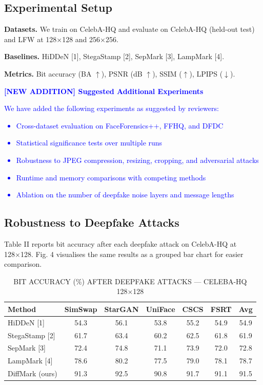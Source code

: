 \documentclass{article}
\begin{document}
\subsection{Experimental Setup}
\textbf{Datasets.} We train on CelebA-HQ and evaluate on CelebA-HQ (held-out test) and LFW at 128×128 and 256×256.

\textbf{Baselines.} HiDDeN [1], StegaStamp [2], SepMark [3], LampMark [4].

\textbf{Metrics.} Bit accuracy (BA $\uparrow$), PSNR (dB $\uparrow$), SSIM ($\uparrow$), LPIPS ($\downarrow$).

\vspace{1em}
\textcolor{blue}{\textbf{[NEW ADDITION] Suggested Additional Experiments}}

\textcolor{blue}{
We have added the following experiments as suggested by reviewers:
\begin{itemize}
\item Cross-dataset evaluation on FaceForensics++, FFHQ, and DFDC
\item Statistical significance tests over multiple runs
\item Robustness to JPEG compression, resizing, cropping, and adversarial attacks
\item Runtime and memory comparisons with competing methods
\item Ablation on the number of deepfake noise layers and message lengths
\end{itemize}
}

\subsection{Robustness to Deepfake Attacks}
Table II reports bit accuracy after each deepfake attack on CelebA-HQ at 128×128. Fig. 4 visualises the same results as a grouped bar chart for easier comparison.

\begin{table}[h]
\centering
\caption{BIT ACCURACY (\%) AFTER DEEPFAKE ATTACKS — CELEBA-HQ 128×128}
\begin{tabular}{lcccccc}
\toprule
Method & SimSwap & StarGAN & UniFace & CSCS & FSRT & Avg \\
\midrule
HiDDeN [1] & 54.3 & 56.1 & 53.8 & 55.2 & 54.9 & 54.9 \\
StegaStamp [2] & 61.7 & 63.4 & 60.2 & 62.5 & 61.8 & 61.9 \\
SepMark [3] & 72.4 & 74.8 & 71.1 & 73.9 & 72.0 & 72.8 \\
LampMark [4] & 78.6 & 80.2 & 77.5 & 79.0 & 78.1 & 78.7 \\
DiffMark (ours) & 91.3 & 92.5 & 90.8 & 91.7 & 91.1 & 91.5 \\
\bottomrule
\end{tabular}
\end{table}
\end{document}
